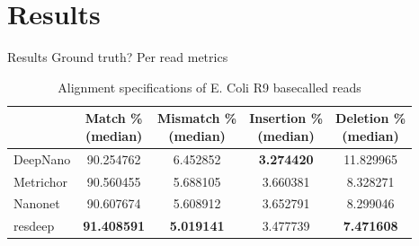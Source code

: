 \documentclass[10pt]{beamer}
\begin{document}
\section{Results}
\begin{frame}[fragile]{Results}
	\alert{Ground truth?}
	Per read metrics

\begin{table}[htbp]
	\caption{Alignment specifications of E. Coli R9 basecalled reads}
	\label{tbl:ecoli_rates}
	\centering
	\begin{tabular}{lcccc}
		\toprule
		{} &  \thead{Match \% \\(median)} &  \thead{Mismatch \% \\(median)} &  \thead{Insertion \% \\(median)} &  \thead{Deletion \% \\(median)} \\
		\midrule
		DeepNano   &                  90.254762 &                      6.452852 &                       \textbf{3.274420} &                     11.829965 \\
		Metrichor  &                  90.560455 &                      5.688105 &                       3.660381 &                      8.328271 \\
		Nanonet    &                  90.607674 &                      5.608912 &                       3.652791 &                      8.299046 \\
		resdeep    &                  \textbf{91.408591} &                     \textbf{ 5.019141} &                       3.477739 &                      \textbf{7.471608 }\\
		\bottomrule
	\end{tabular}
\end{table}
	
\end{frame}
\end{document}
